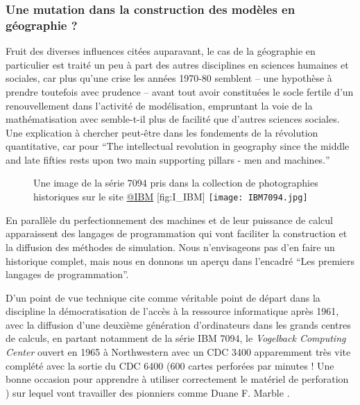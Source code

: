 \subsubsection{Une mutation dans la construction des modèles en géographie ?}
\label{ssec:crise_mutation}

Fruit des diverses influences citées auparavant, le cas de la géographie en particulier est traité un peu à part des autres disciplines en sciences humaines et sociales, car plus qu'une crise les années 1970-80 semblent -- une hypothèse à prendre toutefois avec prudence -- avant tout avoir constituées le socle fertile d'un renouvellement dans l'activité de modélisation, empruntant la voie de la mathématisation avec semble-t-il plus de facilité que d'autres sciences sociales. Une explication à chercher peut-être dans les fondements de la révolution quantitative, car pour \textcite{Gould1970} \foreignquote{english}{The intellectual revolution in geography since the middle and late fifties rests upon two main supporting pillars - men and machines.}

\begin{figure}[!htbp]
\begin{sidecaption}[fortoc]{Une image de la série 7094 pris dans la collection de photographies historiques sur le site \href{http://www-03.ibm.com/ibm/history/exhibits/mainframe/mainframe_album.html}{@IBM} }[fig:I_IBM]
  \centering
 \texttt{[image: IBM7094.jpg]}
  \end{sidecaption}
\end{figure}

En parallèle du perfectionnement des machines et de leur puissance de calcul apparaissent des langages de programmation qui vont faciliter la construction et la diffusion des méthodes de simulation. Nous n'envisageons pas d'en faire un historique complet, mais nous en donnons un aperçu dans l'encadré \enquote{Les premiers langages de programmation}.

D'un point de vue technique \textcite{Haggett1969} cite comme véritable point de départ dans la discipline la démocratisation de l'accès à la ressource informatique après 1961, avec la diffusion d'une deuxième génération d'ordinateurs dans les grands centres de calculs, en partant notamment de la série IBM 7094, le \textit{Vogelback Computing Center}  ouvert en 1965 à Northwestern avec un CDC 3400 apparemment très vite complété avec la sortie du CDC 6400 (600 cartes perforées par minutes ! Une bonne occasion pour apprendre à utiliser correctement le matériel de perforation \autocite{Fisk2005}) sur lequel vont travailler des pionniers comme Duane F. Marble . 


